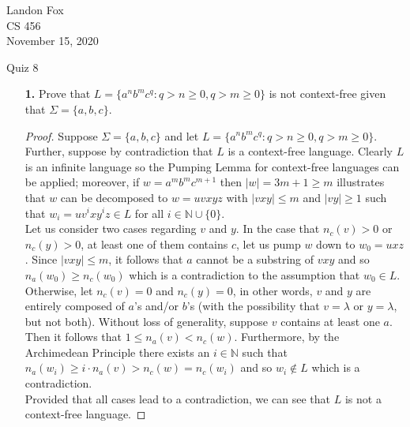 \documentclass[ 12pt ]{article}
\begin{document}
\noindent Landon Fox \\
\noindent CS 456 \\
\noindent November 15, 2020

\begin{center}
	\Large Quiz 8
\end{center}

\begin{enumerate}
	\item[\textbf{1.}] Prove that $L = \{ a^n b^m c^q : q > n \geq 0, q > m \geq 0\}$ is not context-free given that $\Sigma = \{ a, b, c \}$.

		\begin{proof}
			Suppose $\Sigma = \{ a, b, c \}$ and let $L = \{ a^n b^m c^q : q > n \geq 0, q > m \geq 0\}$. Further, suppose by contradiction that $L$ is a context-free language.
			Clearly $L$ is an infinite language so the Pumping Lemma for context-free languages can be applied; moreover, if $w = a^m b^m c^{m+1}$ then $|w| = 3m + 1 \geq m$ illustrates
			that $w$ can be decomposed to $w = uvxyz$ with $|vxy| \leq m$ and $|vy| \geq 1$ such that $w_i = uv^ixy^iz \in L$ for all $i \in \mathbb{N} \cup \{ 0 \}$. \\

			Let us consider two cases regarding $v$ and $y$. In the case that $n_c(v) > 0$ or $n_c(y) > 0$, at least one of them contains $c$, let us pump $w$ down to $w_0 = uxz$. Since
			$|vxy| \leq m$, it follows that $a$ cannot be a substring of $vxy$ and so $n_a(w_0) \geq n_c(w_0)$ which is a contradiction to the assumption that $w_0 \in L$. \\

			Otherwise, let $n_c(v) = 0$ and $n_c(y) = 0$, in other words, $v$ and $y$ are entirely composed of $a$'s and/or $b$'s (with the possibility that $v = \lambda$ or $y =
			\lambda$, but not both). Without loss of generality, suppose $v$ contains at least one $a$. Then it follows that $1 \leq n_a(v) < n_c(w)$. Furthermore, by the Archimedean
			Principle there exists an $i \in \mathbb{N}$ such that $n_a(w_i) \geq i \cdot n_a(v) > n_c(w) = n_c(w_i)$ and so $w_i \notin L$ which is a contradiction. \\

			Provided that all cases lead to a contradiction, we can see that $L$ is not a context-free language.
		\end{proof}
\end{enumerate}
\end{document}
